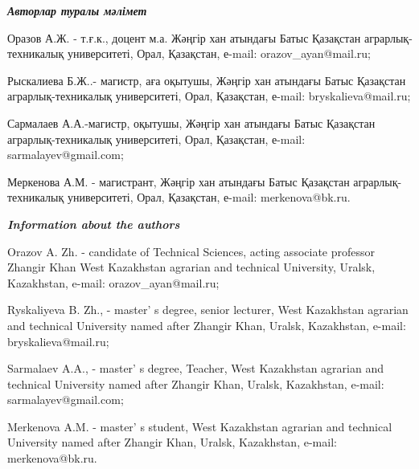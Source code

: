 \begin{info}
\hspace{1em}\emph{{\bfseries Авторлар туралы мәлімет}}

Оразов А.Ж. - т.ғ.к., доцент м.а. Жәңгір хан атындағы Батыс Қазақстан
аграрлық-техникалық университеті, Орал, Қазақстан, е-mail:
orazov\_ayan@mail.ru;

Рыскалиева Б.Ж..- магистр, аға оқытушы, Жәңгір хан атындағы Батыс
Қазақстан аграрлық-техникалық университеті, Орал, Қазақстан, е-mail:
bryskalieva@mail.ru;

Сармалаев А.А.-магистр, оқытушы, Жәңгір хан атындағы Батыс Қазақстан
аграрлық-техникалық университеті, Орал, Қазақстан, е-mail:
sarmalayev@gmail.com;

Меркенова А.М. - магистрант, Жәңгір хан атындағы Батыс Қазақстан
аграрлық-техникалық университеті, Орал, Қазақстан, е-mail:
merkenova@bk.ru.

\hspace{1em}\emph{{\bfseries Information about the authors}}

Orazov A. Zh. - candidate of Technical Sciences, acting associate
professor Zhangir Khan West Kazakhstan agrarian and technical
University, Uralsk, Kazakhstan, e-mail:
orazov\_ayan@mail.ru;

Ryskaliyeva B. Zh., - master' s degree, senior lecturer,
West Kazakhstan agrarian and technical University named after Zhangir
Khan, Uralsk, Kazakhstan, e-mail:
bryskalieva@mail.ru;

Sarmalaev A.A., - master' s degree, Teacher, West
Kazakhstan agrarian and technical University named after Zhangir Khan,
Uralsk, Kazakhstan, e-mail:
sarmalayev@gmail.com;

Merkenova A.M. - master' s student, West Kazakhstan
agrarian and technical University named after Zhangir Khan, Uralsk,
Kazakhstan, e-mail:
merkenova@bk.ru.
\end{info}
